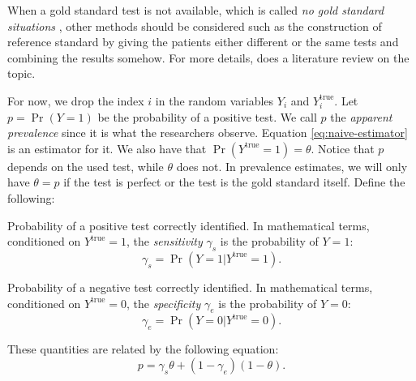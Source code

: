 \begin{remark}
  When a gold standard test is not available, which is called {\em no gold standard
  situations} \cite[p. 1]{rutjes2007evaluation}, other methods should be
  considered such as the construction of reference standard by giving the
  patients either different or the same tests and combining the results
  somehow. For more details, \textcite{rutjes2007evaluation} does a literature
 review on the topic.  
\end{remark}

For now, we drop the index $i$ in the random variables $Y_i$ and
$Y_i^{\mathrm{true}}$. Let $p = \Pr(Y = 1)$ be the probability of a positive test.
We call $p$ the {\em apparent prevalence} since it is what the researchers 
observe. Equation \eqref{eq:naive-estimator} is an estimator for it. 
We also have that $\Pr(Y^{\mathrm{true}} = 1) = \theta$. Notice that $p$
depends on the used test, while $\theta$ does not. In prevalence estimates, we 
will only have $\theta = p$ if the test is perfect or the test is the 
gold standard itself. Define the following: 

\begin{definition}[Sensitivity]
  Probability of a positive test correctly identified. In mathematical terms,
  conditioned on $Y^{\mathrm{true}} = 1$, the {\em sensitivity} $\gamma_s$ is 
  the probability of $Y = 1$: 
  \begin{equation}
    \gamma_s = \Pr(Y = 1|Y^{\mathrm{true}} = 1). 
  \end{equation} 
\end{definition}

\begin{definition}[Specificity]
  Probability of a negative test correctly identified. In mathematical terms,
  conditioned on $Y^{\mathrm{true}} = 0$, the {\em specificity} $\gamma_e$ is 
  the probability of $Y = 0$: 
  \begin{equation}
    \gamma_e = \Pr(Y = 0|Y^{\mathrm{true}} = 0). 
  \end{equation} 
\end{definition}

\begin{theorem} These quantities are related by the following equation:
  \begin{equation}
    \label{eq:apparent-true-prevalence}
    p = \gamma_s\theta + (1-\gamma_e)(1-\theta).
  \end{equation}
  
\end{theorem}

